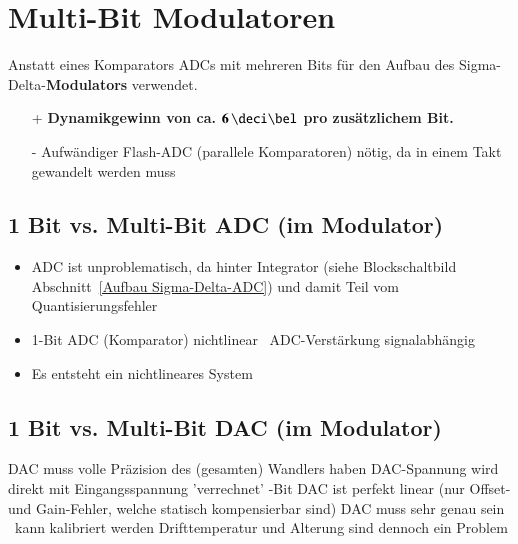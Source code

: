 
\section{Multi-Bit Modulatoren}

Anstatt eines Komparators ADCs mit mehreren Bits für den Aufbau des Sigma-Delta-\textbf{Modulators} verwendet.

\begin{minipage}[t]{0.48\columnwidth}
    \begin{itemize}
        \item[+] \textbf{Dynamikgewinn von ca. $\bm{6 \, \deci \bel }$ pro zusätzlichem Bit.}
    \end{itemize}
\end{minipage}
\hfill
\begin{minipage}[t]{0.48\columnwidth}
    \begin{itemize}
        \item[-] Aufwändiger Flash-ADC (parallele Komparatoren) nötig, da in einem Takt gewandelt werden muss
    \end{itemize}
\end{minipage}


\subsection{1 Bit vs. Multi-Bit ADC (im Modulator)}

\begin{itemize}
    \item ADC ist unproblematisch, da hinter Integrator (siehe Blockschaltbild Abschnitt~\ref{Aufbau Sigma-Delta-ADC}) und damit 
        Teil vom Quantisierungsfehler
    \item 1-Bit ADC (Komparator) nichtlinear \textrightarrow\ ADC-Verstärkung signalabhängig
    \item Es entsteht ein nichtlineares System
\end{itemize}


\subsection{1 Bit vs. Multi-Bit DAC (im Modulator)}

\begin{outline}
    \1 DAC muss volle Präzision des (gesamten) Wandlers haben
        \2 DAC-Spannung wird direkt mit Eingangsspannung 'verrechnet'
    -Bit DAC ist perfekt linear (nur Offset- und Gain-Fehler, welche statisch kompensierbar sind)
    \1 DAC muss sehr genau sein \textrightarrow\ kann kalibriert werden
        \2 Drifttemperatur und Alterung sind dennoch ein Problem
\end{outline}


